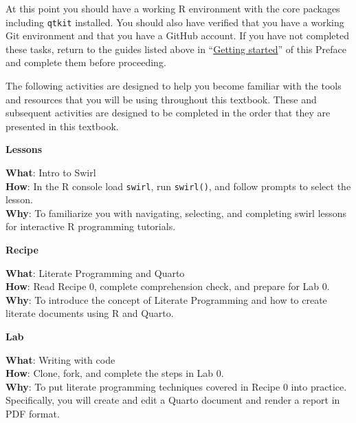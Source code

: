 \documentclass[
  letterpaper,
]{latex/krantz}
\theoremstyle{definition}
\theoremstyle{remark}
\begin{document}

At this point you should have a working R environment with the core
packages including \texttt{qtkit} installed. You should also have
verified that you have a working Git environment and that you have a
GitHub account. If you have not completed these tasks, return to the
guides listed above in ``\hyperref[sec-p-getting-started]{Getting
started}'' of this Preface and complete them before proceeding.

The following activities are designed to help you become familiar with
the tools and resources that you will be using throughout this textbook.
These and subsequent activities are designed to be completed in the
order that they are presented in this textbook.

\begin{tcolorbox}[enhanced jigsaw, colframe=quarto-callout-color-frame, breakable, bottomrule=.15mm, arc=.35mm, left=2mm, opacityback=0, rightrule=.15mm, colback=white, toprule=.15mm, leftrule=.75mm]

\textbf{ Lessons}

\textbf{What}: Intro to Swirl\\
\textbf{How}: In the R console load \texttt{swirl}, run
\texttt{swirl()}, and follow prompts to select the lesson.\\
\textbf{Why}: To familiarize you with navigating, selecting, and
completing swirl lessons for interactive R programming tutorials.

\end{tcolorbox}

\begin{tcolorbox}[enhanced jigsaw, colframe=quarto-callout-color-frame, breakable, bottomrule=.15mm, arc=.35mm, left=2mm, opacityback=0, rightrule=.15mm, colback=white, toprule=.15mm, leftrule=.75mm]

\textbf{ Recipe}

\textbf{What}: Literate Programming and Quarto\\
\textbf{How}: Read Recipe 0, complete comprehension check, and prepare
for Lab 0.\\
\textbf{Why}: To introduce the concept of Literate Programming and how
to create literate documents using R and Quarto.

\end{tcolorbox}

\begin{tcolorbox}[enhanced jigsaw, colframe=quarto-callout-color-frame, breakable, bottomrule=.15mm, arc=.35mm, left=2mm, opacityback=0, rightrule=.15mm, colback=white, toprule=.15mm, leftrule=.75mm]

\textbf{ Lab}

\textbf{What}: Writing with code\\
\textbf{How}: Clone, fork, and complete the steps in Lab 0.\\
\textbf{Why}: To put literate programming techniques covered in Recipe 0
into practice. Specifically, you will create and edit a Quarto document
and render a report in PDF format.

\end{tcolorbox}
\end{document}
